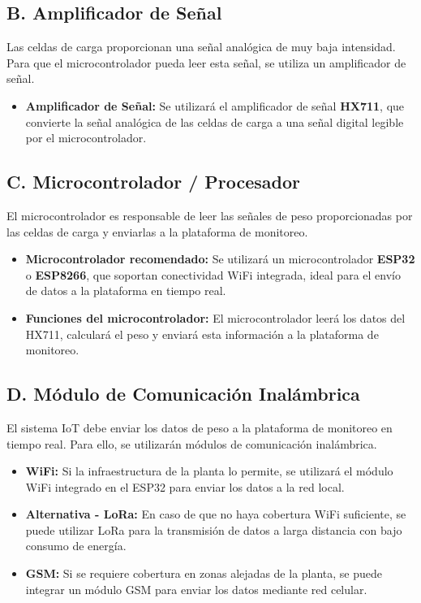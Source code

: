 \documentclass{article}
\begin{document}
\subsection{B. Amplificador de Señal}
Las celdas de carga proporcionan una señal analógica de muy baja intensidad. Para que el microcontrolador pueda leer esta señal, se utiliza un amplificador de señal.

\begin{itemize}
    \item \textbf{Amplificador de Señal:} Se utilizará el amplificador de señal \textbf{HX711}, que convierte la señal analógica de las celdas de carga a una señal digital legible por el microcontrolador.
\end{itemize}

\subsection{C. Microcontrolador / Procesador}
El microcontrolador es responsable de leer las señales de peso proporcionadas por las celdas de carga y enviarlas a la plataforma de monitoreo.

\begin{itemize}
    \item \textbf{Microcontrolador recomendado:} Se utilizará un microcontrolador \textbf{ESP32} o \textbf{ESP8266}, que soportan conectividad WiFi integrada, ideal para el envío de datos a la plataforma en tiempo real.
    \item \textbf{Funciones del microcontrolador:} El microcontrolador leerá los datos del HX711, calculará el peso y enviará esta información a la plataforma de monitoreo.
\end{itemize}

\subsection{D. Módulo de Comunicación Inalámbrica}
El sistema IoT debe enviar los datos de peso a la plataforma de monitoreo en tiempo real. Para ello, se utilizarán módulos de comunicación inalámbrica.

\begin{itemize}
    \item \textbf{WiFi:} Si la infraestructura de la planta lo permite, se utilizará el módulo WiFi integrado en el ESP32 para enviar los datos a la red local.
    \item \textbf{Alternativa - LoRa:} En caso de que no haya cobertura WiFi suficiente, se puede utilizar LoRa para la transmisión de datos a larga distancia con bajo consumo de energía.
    \item \textbf{GSM:} Si se requiere cobertura en zonas alejadas de la planta, se puede integrar un módulo GSM para enviar los datos mediante red celular.
\end{itemize}
\end{document}
